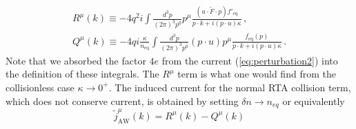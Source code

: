\begin{align}
\label{eq:Rmu}R^\mu(k)  \equiv -4q^2i \int \frac{d^3p}{(2\pi)^3p^0} p^\mu \frac{(u \cdot \widetilde{F} \cdot p)f'_\mathrm{eq}}{p \cdot k + i (p \cdot u)\kappa}\,,\\
\label{eq:Qmu}Q^\mu(k) \equiv -4qi \frac{\kappa}{n_\mathrm{eq}}\int \frac{d^3p}{(2\pi)^3p^0}(p\cdot u) p^\mu \frac{f_\mathrm{eq}(p)}{p\cdot k + i(p \cdot u)\kappa}\,.
\end{align} 
Note that we absorbed the factor $4e$ from the current (\ref{eq:perturbation2}) into the definition of these integrals. The $R^{\mu}$ term is what one would find from the collisionless case $\kappa \rightarrow 0^+$. The induced current for the normal RTA collision term, which does not conserve current, is obtained by setting $\delta n \rightarrow n_{eq}$ or equivalently
\begin{equation}\label{eq:jRTA}
\widetilde{j}_{\mathrm{AW}}^\mu(k) = R^\mu(k) - Q^\mu(k)
\end{equation}

